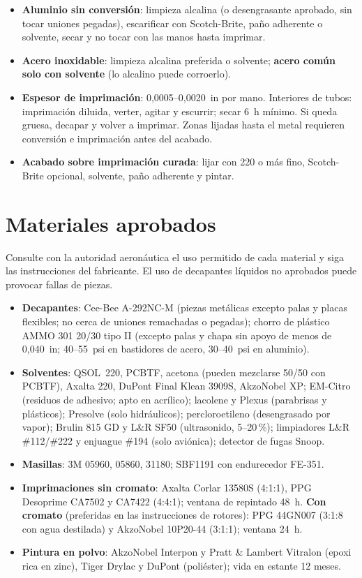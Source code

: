 \begin{itemize}
\item \textbf{Aluminio sin conversión}: limpieza alcalina (o desengrasante aprobado, sin tocar uniones pegadas), escarificar con Scotch-Brite, paño adherente o solvente, secar y no tocar con las manos hasta imprimar.
\item \textbf{Acero inoxidable}: limpieza alcalina preferida o solvente; \textbf{acero común solo con solvente} (lo alcalino puede corroerlo).
\item \textbf{Espesor de imprimación}: 0,0005--0,0020~in por mano. Interiores de tubos: imprimación diluida, verter, agitar y escurrir; secar 6~h mínimo. Si queda gruesa, decapar y volver a imprimar. Zonas lijadas hasta el metal requieren conversión e imprimación antes del acabado.
\item \textbf{Acabado sobre imprimación curada}: lijar con 220 o más fino, Scotch-Brite opcional, solvente, paño adherente y pintar.
\end{itemize}

\section{Materiales aprobados}

\begin{precaucion}
Consulte con la autoridad aeronáutica el uso permitido de cada material y siga las instrucciones del fabricante. El uso de decapantes líquidos no aprobados puede provocar fallas de piezas.
\end{precaucion}

\begin{itemize}
\item \textbf{Decapantes}: Cee-Bee A-292NC-M (piezas metálicas excepto palas y placas flexibles; no cerca de uniones remachadas o pegadas); chorro de plástico AMMO 301 20/30 tipo II (excepto palas y chapa sin apoyo de menos de 0,040~in; 40--55~psi en bastidores de acero, 30--40~psi en aluminio).
\item \textbf{Solventes}: QSOL~220, PCBTF, acetona (pueden mezclarse 50/50 con PCBTF), Axalta 220, DuPont Final Klean 3909S, AkzoNobel XP; EM-Citro (residuos de adhesivo; apto en acrílico); lacolene y Plexus (parabrisas y plásticos); Presolve (solo hidráulicos); percloroetileno (desengrasado por vapor); Brulin 815 GD y L\&R SF50 (ultrasonido, 5--20\,\%); limpiadores L\&R \#112/\#222 y enjuague \#194 (solo aviónica); detector de fugas Snoop.
\item \textbf{Masillas}: 3M 05960, 05860, 31180; SBF1191 con endurecedor FE-351.
\item \textbf{Imprimaciones sin cromato}: Axalta Corlar 13580S (4:1:1), PPG Desoprime CA7502 y CA7422 (4:4:1); ventana de repintado 48~h. \textbf{Con cromato} (preferidas en las instrucciones de rotores): PPG 44GN007 (3:1:8 con agua destilada) y AkzoNobel 10P20-44 (3:1:1); ventana 24~h.
\item \textbf{Pintura en polvo}: AkzoNobel Interpon y Pratt \& Lambert Vitralon (epoxi rica en zinc), Tiger Drylac y DuPont (poliéster); vida en estante 12 meses.
\end{itemize}

